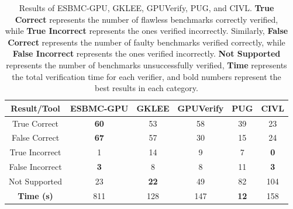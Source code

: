 \documentclass[times, doublespace]{cpeauth}
\begin{document}
\newpage
\begin{table}[bh]
 \caption{Results of ESBMC-GPU, GKLEE, GPUVerify, PUG, and CIVL. \textbf{True Correct} represents the number of flawless benchmarks correctly verified, while \textbf{True Incorrect} represents the ones verified incorrectly. Similarly, \textbf{False Correct} represents the number of faulty benchmarks verified correctly, while \textbf{False Incorrect} represents the ones verified incorrectly. \textbf{Not Supported} represents the number of benchmarks unsuccessfully verified, \textbf{Time} represents the total verification time for each verifier, and bold numbers represent the best results in each category.}
\centering
\label{table:nonlin}
\begin{tabular}{c c c c c c c}
\hline
\multicolumn{2}{|c|}{\textbf{Result/Tool}}
& \multicolumn{1}{c|}{\textbf{ESBMC-GPU}}	& \multicolumn{1}{c|}{\textbf{GKLEE}}	& \multicolumn{1}{c|}{\textbf{GPUVerify}}	& \multicolumn{1}{c|}{\textbf{PUG}}	& \multicolumn{1}{c|}{\textbf{CIVL}}	\\ \hline
\multicolumn{2}{|c|}{True Correct}
& \multicolumn{1}{c|}{\textbf{60}}		& \multicolumn{1}{c|}{53}	& \multicolumn{1}{c|}{58}	& \multicolumn{1}{c|}{39}	& \multicolumn{1}{c|}{23}	\\ \hline
\multicolumn{2}{|c|}{False Correct}                                               
& \multicolumn{1}{c|}{\textbf{67}} 		& \multicolumn{1}{c|}{57}	& \multicolumn{1}{c|}{30} 	& \multicolumn{1}{c|}{15}	& \multicolumn{1}{c|}{24}	\\ \hline
\multicolumn{2}{|c|}{True Incorrect}
& \multicolumn{1}{c|}{1}			& \multicolumn{1}{c|}{14}       & \multicolumn{1}{c|}{9}	& \multicolumn{1}{c|}{7}	& \multicolumn{1}{c|}{\textbf{0}}	\\ \hline
\multicolumn{2}{|c|}{False Incorrect}
& \multicolumn{1}{c|}{\textbf{3}}		& \multicolumn{1}{c|}{8}        & \multicolumn{1}{c|}{8}	& \multicolumn{1}{c|}{11}	& \multicolumn{1}{c|}{\textbf{3}}	\\ \hline
\multicolumn{2}{|c|}{Not Supported}
& \multicolumn{1}{c|}{23}		& \multicolumn{1}{c|}{\textbf{22}}       & \multicolumn{1}{c|}{49}	& \multicolumn{1}{c|}{82}	& \multicolumn{1}{c|}{104}	\\ \hline
\multicolumn{2}{|c|}{\textbf{Time (s)}}
& \multicolumn{1}{c|}{811}			& \multicolumn{1}{c|}{128}	& \multicolumn{1}{c|}{147}     	& \multicolumn{1}{c|}{\textbf{12}} & \multicolumn{1}{c|}{158}	\\ \hline
\end{tabular}
\end{table}
\end{document}

